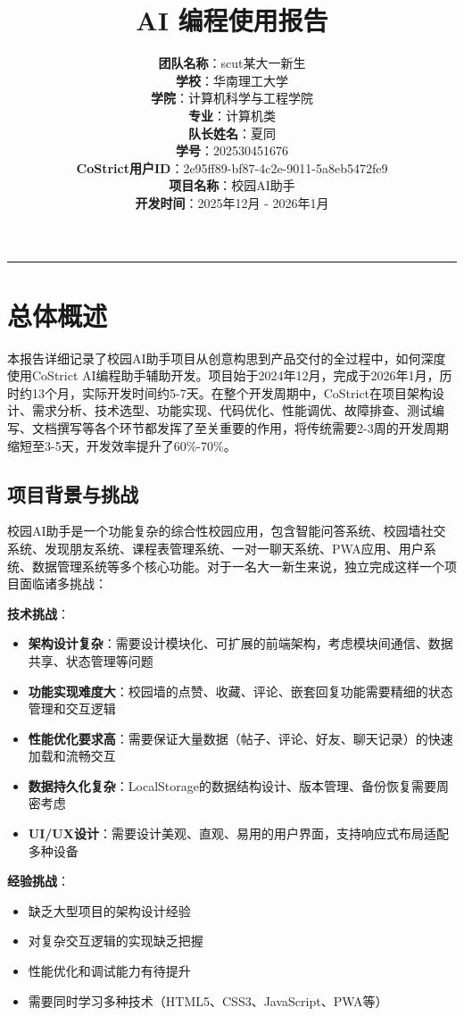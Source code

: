 \documentclass[12pt,a4paper]{article}
\title{\textbf{AI 编程使用报告}}
\author{
    \textbf{团队名称}：scut某大一新生 \\
    \vspace{0.3cm}
    \textbf{学校}：华南理工大学 \\
    \vspace{0.3cm}
    \textbf{学院}：计算机科学与工程学院 \\
    \vspace{0.3cm}
    \textbf{专业}：计算机类 \\
    \vspace{0.3cm}
    \textbf{队长姓名}：夏同 \\
    \vspace{0.3cm}
    \textbf{学号}：202530451676 \\
    \vspace{0.3cm}
    \textbf{CoStrict用户ID}：2e95ff89-bf87-4c2e-9011-5a8eb5472fe9 \\
    \vspace{0.3cm}
    \textbf{项目名称}：校园AI助手 \\
    \vspace{0.3cm}
    \textbf{开发时间}：2025年12月 - 2026年1月
}
\date{}
\begin{document}
\maketitle

\hrule
\vspace{1cm}

\section{总体概述}

本报告详细记录了校园AI助手项目从创意构思到产品交付的全过程中，如何深度使用CoStrict AI编程助手辅助开发。项目始于2024年12月，完成于2026年1月，历时约13个月，实际开发时间约5-7天。在整个开发周期中，CoStrict在项目架构设计、需求分析、技术选型、功能实现、代码优化、性能调优、故障排查、测试编写、文档撰写等各个环节都发挥了至关重要的作用，将传统需要2-3周的开发周期缩短至3-5天，开发效率提升了60\%-70\%。

\subsection{项目背景与挑战}

校园AI助手是一个功能复杂的综合性校园应用，包含智能问答系统、校园墙社交系统、发现朋友系统、课程表管理系统、一对一聊天系统、PWA应用、用户系统、数据管理系统等多个核心功能。对于一名大一新生来说，独立完成这样一个项目面临诸多挑战：

\textbf{技术挑战}：
\begin{itemize}
    \item \textbf{架构设计复杂}：需要设计模块化、可扩展的前端架构，考虑模块间通信、数据共享、状态管理等问题
    \item \textbf{功能实现难度大}：校园墙的点赞、收藏、评论、嵌套回复功能需要精细的状态管理和交互逻辑
    \item \textbf{性能优化要求高}：需要保证大量数据（帖子、评论、好友、聊天记录）的快速加载和流畅交互
    \item \textbf{数据持久化复杂}：LocalStorage的数据结构设计、版本管理、备份恢复需要周密考虑
    \item \textbf{UI/UX设计}：需要设计美观、直观、易用的用户界面，支持响应式布局适配多种设备
\end{itemize}

\textbf{经验挑战}：
\begin{itemize}
    \item 缺乏大型项目的架构设计经验
    \item 对复杂交互逻辑的实现缺乏把握
    \item 性能优化和调试能力有待提升
    \item 需要同时学习多种技术（HTML5、CSS3、JavaScript、PWA等）
\end{itemize}
\end{document}
